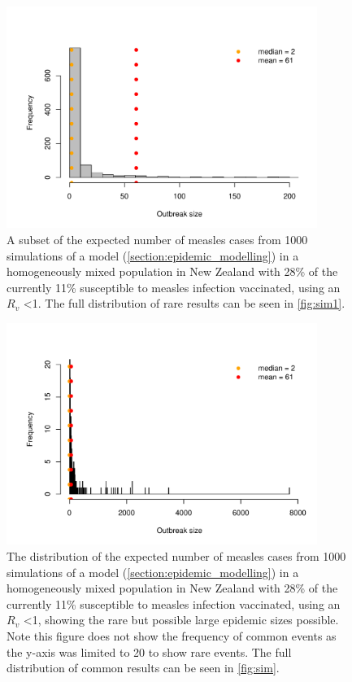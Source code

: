 \documentclass{article}
\begin{document}
\begin{figure}
     \centering
     \includegraphics[width=0.9\textwidth]{sim.pdf}
     \caption{A subset of the expected number of measles cases from 1000 simulations of a model (\autoref{section:epidemic_modelling}) in a homogeneously mixed population in New Zealand with 28\% of the currently 11\% susceptible to measles infection vaccinated, using an $R_v$ <1. The full distribution of rare results can be seen in \autoref{fig:sim1}.}
     \label{fig:sim}
\end{figure}

\begin{figure}
     \centering
     \includegraphics[width=0.9\textwidth]{sim1.pdf}
  \caption{The distribution of the expected number of measles cases from 1000 simulations of a model (\autoref{section:epidemic_modelling}) in a homogeneously mixed population in New Zealand with 28\% of the currently 11\% susceptible to measles infection vaccinated, using an $R_v$ <1, showing the rare but possible large epidemic sizes possible. Note this figure does not show the frequency of common events as the y-axis was limited to 20 to show rare events. The full distribution of common results can be seen in \autoref{fig:sim}.}
     \label{fig:sim1}
\end{figure}
\end{document}
